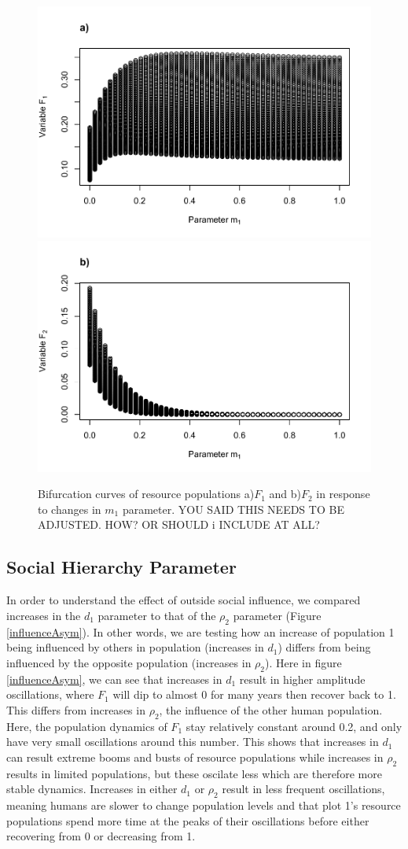 \documentclass[
  12pt,
]{article}
\begin{document}
\begin{figure}
\includegraphics[width=0.5\linewidth]{Wulfing_CH2_Draft4_files/figure-latex/mBifCurve-1} \includegraphics[width=0.5\linewidth]{Wulfing_CH2_Draft4_files/figure-latex/mBifCurve-2} \caption{Bifurcation curves of resource populations a)\(F_1\) and b)\(F_2\) in response to changes in \(m_1\) parameter. YOU SAID THIS NEEDS TO BE ADJUSTED. HOW? OR SHOULD i INCLUDE AT ALL? \label{mBifCurve}}\label{fig:mBifCurve}
\end{figure}

\hypertarget{social-hierarchy-parameter}{%
\subsection{Social Hierarchy Parameter}\label{social-hierarchy-parameter}}

In order to understand the effect of outside social influence, we compared increases in the \(d_1\) parameter to that of the \(\rho_2\) parameter (Figure \ref{influenceAsym}). In other words, we are testing how an increase of population 1 being influenced by others in population (increases in \(d_1\)) differs from being influenced by the opposite population (increases in \(\rho_2\)). Here in figure \ref{influenceAsym}, we can see that increases in \(d_1\) result in higher amplitude oscillations, where \(F_1\) will dip to almost 0 for many years then recover back to 1. This differs from increases in \(\rho_2\), the influence of the other human population. Here, the population dynamics of \(F_1\) stay relatively constant around 0.2, and only have very small oscillations around this number. This shows that increases in \(d_1\) can result extreme booms and busts of resource populations while increases in \(\rho_2\) results in limited populations, but these oscilate less which are therefore more stable dynamics. Increases in either \(d_1\) or \(\rho_2\) result in less frequent oscillations, meaning humans are slower to change population levels and that plot 1's resource populations spend more time at the peaks of their oscillations before either recovering from 0 or decreasing from 1.
\end{document}
